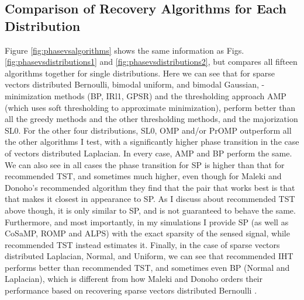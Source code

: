 \documentclass[11pt,draftcls,onecolumn]{IEEEtran}
\begin{document}
\clearpage

\subsection{Comparison of Recovery Algorithms for Each Distribution}
Figure \ref{fig:phasevsalgorithms} shows the same information as
Figs. \ref{fig:phasevsdistributions1} and \ref{fig:phasevsdistributions2},
but compares all fifteen algorithms together for single distributions.
Here we can see that for sparse vectors distributed Bernoulli,
bimodal uniform, and bimodal Gaussian, -minimization methods (BP, IRl1, GPSR)
and the thresholding approach AMP (which uses soft thresholding
to approximate  minimization), perform better than all the
greedy methods and the other thresholding methods, and the majorization SL0.
For the other four distributions,
SL0, OMP and/or PrOMP outperform all the other algorithms I test,
with a significantly higher phase transition
in the case of vectors distributed Laplacian.
In every case, AMP and BP perform the same.
We can also see in all cases the phase transition for SP 
is higher than that for recommended TST, and sometimes much higher, 
even though for Maleki and Donoho's recommended algorithm
they find that the  pair that works best is that
that makes it closest in appearance to SP.
As I discuss about recommended TST above though, 
it is only similar to SP, 
and is not guaranteed to behave the same.
Furthermore, and most importantly,
in my simulations I provide SP (as well as CoSaMP, ROMP and ALPS)
with the exact sparsity of the sensed signal,
while recommended TST instead estimates it.
Finally, in the case of sparse vectors distributed Laplacian, Normal, and Uniform,
we can see that recommended IHT performs better than recommended TST,
and sometimes even BP (Normal and Laplacian), 
which is different from how Maleki and Donoho orders their performance
based on recovering sparse vectors distributed Bernoulli \cite{Maleki2010}.
\end{document}
